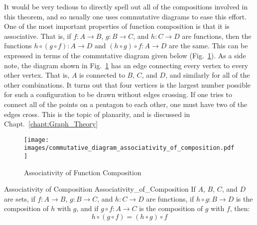         It would be very tedious to directly spell out all of the compositions
        involved in this theorem, and so usually one uses commutative diagrams
        to ease this effort. One of the most important properties of function
        composition is that it is associative. That is, if $f:A\rightarrow{B}$,
        $g:B\rightarrow{C}$, and $h:C\rightarrow{D}$ are functions, then the
        functions $h\circ(g\circ{f}):A\rightarrow{D}$ and
        $(h\circ{g})\circ{f}:A\rightarrow{D}$ are the same. This can be
        expressed in terms of the commutative diagram given below
        (Fig.~\ref{fig:Associativity_of_Function_Comp}). As a side note, the
        diagram shown in Fig.~\ref{fig:Associativity_of_Function_Comp} has an
        edge connecting every vertex to every other vertex. That is, $A$ is
        connected to $B$, $C$, and $D$, and similarly for all of the other
        combinations. It turns out that four vertices is the largest number
        possible for such a configuration to be drawn without edges crossing.
        If one tries to connect all of the points on a pentagon to each other,
        one must have two of the edges cross. This is the topic of planarity,
        and is discussed in Chapt.~\ref{chapt:Graph_Theory}
        \begin{figure}[H]
            \centering
            \captionsetup{type=figure}
            \texttt{[image: images/commutative\_diagram\_associativity\_of\_composition.pdf]}
            \caption{Associativity of Function Composition}
            \label{fig:Associativity_of_Function_Comp}
        \end{figure}
        \begin{ftheorem}{Associativity of Composition}
                        {Associativity_of_Composition}
            If $A$, $B$, $C$, and $D$ are sets, if $f:A\rightarrow{B}$,
            $g:B\rightarrow{C}$, and $h:C\rightarrow{D}$ are functions, if
            $h\circ{g}:B\rightarrow{D}$ is the composition of $h$ with $g$, and
            if $g\circ{f}:A\rightarrow{C}$ is the composition of $g$ with $f$,
            then:
            \begin{equation*}
                h\circ(g\circ{f})=(h\circ{g})\circ{f}
            \end{equation*}
        \end{ftheorem}
